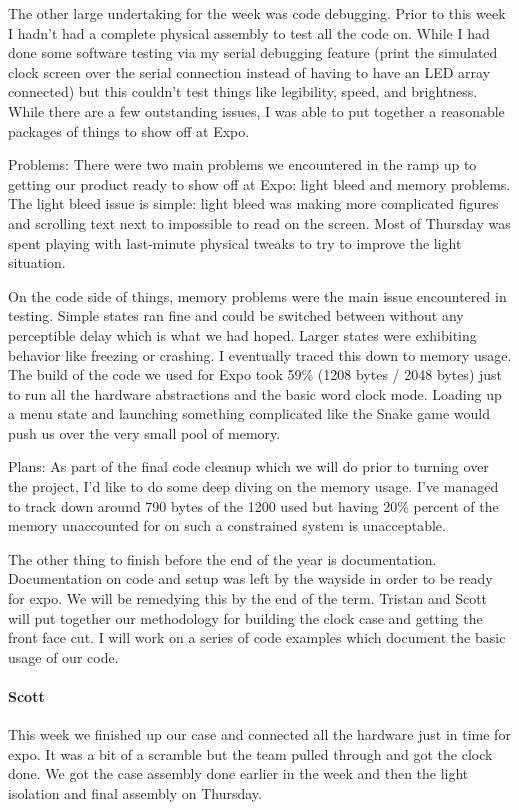 \documentclass[onecolumn, draftclsnofoot,10pt, compsoc]{IEEEtran}
\begin{document}
The other large undertaking for the week was code debugging. Prior to this week I hadn't had a complete physical assembly to test all the code on. While I had done some software testing via my serial debugging feature (print the simulated clock screen over the serial connection instead of having to have an LED array connected) but this couldn't test things like legibility, speed, and brightness. While there are a few outstanding issues, I was able to put together a reasonable packages of things to show off at Expo.

Problems: There were two main problems we encountered in the ramp up to getting our product ready to show off at Expo: light bleed and memory problems. The light bleed issue is simple: light bleed was making more complicated figures and scrolling text next to impossible to read on the screen. Most of Thursday was spent playing with last-minute physical tweaks to try to improve the light situation.

On the code side of things, memory problems were the main issue encountered in testing. Simple states ran fine and could be switched between without any perceptible delay which is what we had hoped. Larger states were exhibiting behavior like freezing or crashing. I eventually traced this down to memory usage. The build of the code we used for Expo took 59\% (1208 bytes / 2048 bytes) just to run all the hardware abstractions and the basic word clock mode. Loading up a menu state and launching something complicated like the Snake game would push us over the very small pool of memory.

Plans: As part of the final code cleanup which we will do prior to turning over the project, I'd like to do some deep diving on the memory usage. I've managed to track down around 790 bytes of the 1200 used but having 20\% percent of the memory unaccounted for on such a constrained system is unacceptable.

The other thing to finish before the end of the year is documentation. Documentation on code and setup was left by the wayside in order to be ready for expo. We will be remedying this by the end of the term. Tristan and Scott will put together our methodology for building the clock case and getting the front face cut. I will work on a series of code examples which document the basic usage of our code.
\paragraph{Scott}
This week we finished up our case and connected all the hardware just in time for expo. It was a bit of a scramble but the team pulled through and got the clock done. We got the case assembly done earlier in the week and then the light isolation and final assembly on Thursday.
\end{document}
